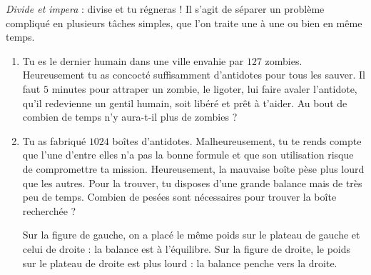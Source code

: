 \documentclass[class=report,crop=false, 12pt]{standalone}
\begin{document}

\emph{Divide et impera} : divise et tu régneras ! Il s'agit de séparer un problème compliqué en plusieurs tâches simples, que l'on traite une à une ou bien en même temps.

\bigskip
\bigskip

\begin{activite}
\sauteligne
\begin{enumerate}
  \item Tu es le dernier humain dans une ville envahie par $127$ zombies. Heureusement tu as concocté suffisamment d'antidotes pour tous les sauver. Il faut $5$ minutes pour attraper un zombie, le ligoter, lui faire avaler l'antidote, qu'il redevienne un gentil humain, soit libéré et prêt à t'aider. Au bout de combien de temps n'y aura-t-il plus de zombies ?
  
  \item Tu as fabriqué $1024$ boîtes d'antidotes. Malheureusement, tu te rends compte que l'une d'entre elles n'a pas la bonne formule et que son utilisation risque de compromettre ta mission. 
Heureusement, la mauvaise boîte pèse plus lourd que les autres. Pour la trouver, tu disposes d'une grande balance mais de très peu de temps. Combien de pesées sont nécessaires pour trouver la boîte recherchée ?

Sur la figure de gauche, on a placé le même poids sur le plateau de gauche et celui de droite : la balance est à l'équilibre.
Sur la figure de droite, le poids sur le plateau de droite est plus lourd : la balance penche vers la droite.

\bigskip


  
  

 

\end{enumerate}
\end{activite}
\end{document}
